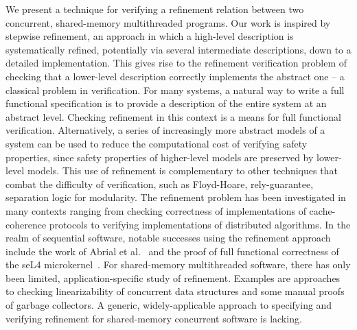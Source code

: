 We present a technique for verifying a refinement relation between two concurrent, shared-memory multithreaded programs. 
Our work is inspired by stepwise refinement, an approach in which a high-level description is systematically refined, 
potentially via several intermediate descriptions, down to a detailed implementation. 
This gives rise to the refinement verification problem of checking that a lower-level description correctly implements the abstract one -- a classical problem in verification.
For many systems, a natural way to write a full functional specification is to provide a description of the entire system at an abstract level. 
Checking refinement in this context is a means for full functional verification. 
Alternatively, a series of increasingly more abstract models of a system can be used to reduce the computational cost of verifying safety properties, since safety properties of higher-level models are preserved by lower-level models. 
This use of refinement is complementary to other techniques that combat the difficulty of verification, such as Floyd-Hoare, rely-guarantee, separation logic for modularity. 
The refinement problem has been investigated in many contexts ranging from checking correctness of implementations of cache-coherence protocols to verifying implementations of distributed algorithms. 
In the realm of sequential software, notable successes using the refinement approach include the work of Abrial et al.~\cite{AbrialBHHMV10} and the proof of full functional correctness of the seL4 microkernel~\cite{KleinAEMSKH14}. 
For shared-memory multithreaded software, there has only been limited, application-specific study of refinement. 
Examples are approaches to checking linearizability of concurrent data structures and some manual proofs of garbage collectors. 
A generic, widely-applicable approach to specifying and verifying refinement for shared-memory concurrent software is lacking. 



